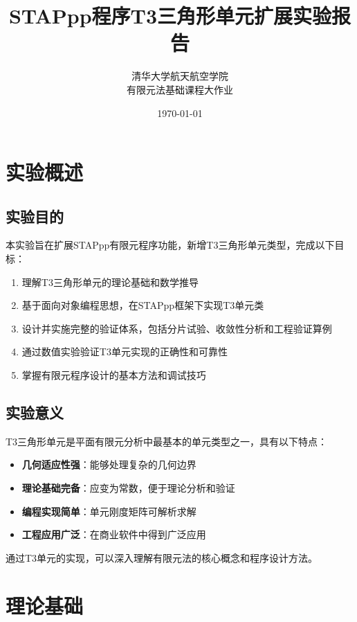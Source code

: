 \documentclass[12pt,a4paper]{article}
\title{\textbf{STAPpp程序T3三角形单元扩展实验报告}}
\author{清华大学航天航空学院 \\ 有限元法基础课程大作业}
\date{\today}
\begin{document}
\maketitle

\tableofcontents
\newpage

\section{实验概述}

\subsection{实验目的}

本实验旨在扩展STAPpp有限元程序功能，新增T3三角形单元类型，完成以下目标：

\begin{enumerate}
    \item 理解T3三角形单元的理论基础和数学推导
    \item 基于面向对象编程思想，在STAPpp框架下实现T3单元类
    \item 设计并实施完整的验证体系，包括分片试验、收敛性分析和工程验证算例
    \item 通过数值实验验证T3单元实现的正确性和可靠性
    \item 掌握有限元程序设计的基本方法和调试技巧
\end{enumerate}

\subsection{实验意义}

T3三角形单元是平面有限元分析中最基本的单元类型之一，具有以下特点：
\begin{itemize}
    \item \textbf{几何适应性强}：能够处理复杂的几何边界
    \item \textbf{理论基础完备}：应变为常数，便于理论分析和验证
    \item \textbf{编程实现简单}：单元刚度矩阵可解析求解
    \item \textbf{工程应用广泛}：在商业软件中得到广泛应用
\end{itemize}

通过T3单元的实现，可以深入理解有限元法的核心概念和程序设计方法。

\section{理论基础}
\end{document}
